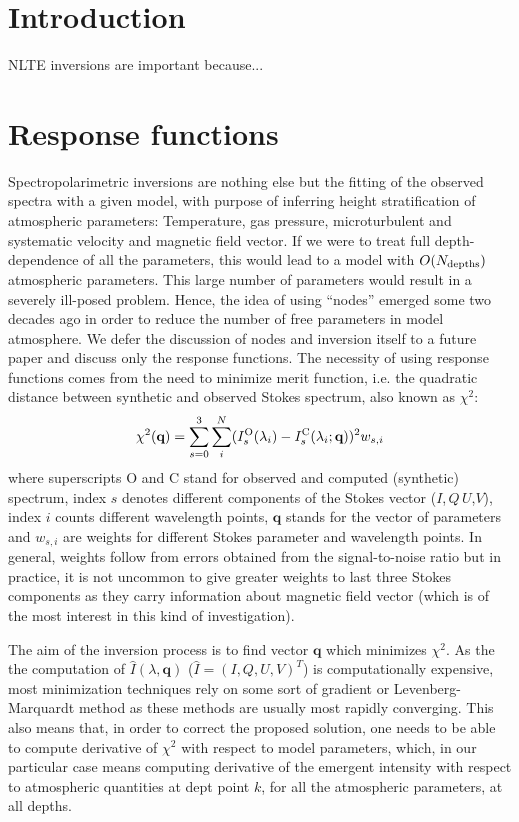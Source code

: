 \documentclass[referee]{aa}
\begin{document}
\section{Introduction}

NLTE inversions are important because... 


\section{Response functions}

Spectropolarimetric inversions are nothing else but the fitting of the observed spectra with a given model, with purpose of inferring height stratification of atmospheric parameters: Temperature, gas pressure, microturbulent and systematic velocity and magnetic field vector. If we were to treat full depth-dependence of all the parameters, this would lead to a model with $O(N_{\rm depths})$ atmospheric parameters. This large number of parameters would result in a severely ill-posed problem. Hence, the idea of using ``nodes'' emerged some two decades ago \citep{SIR} in order to reduce the number of free parameters in model atmosphere. We defer the discussion of nodes and inversion itself to a future paper and discuss only the response functions. The necessity of using response functions comes from the need to minimize merit function, i.e. the quadratic distance between synthetic and observed Stokes spectrum, also known as $\chi^2$:
\begin{equation}
 \chi^2(\textbf{q}) = \sum_{s=0}^3 \sum_{i}^N (I_s^{\rm O}(\lambda_i) - I_s^{\rm C}(\lambda_i; \textbf{q}))^2 w_{s,i}
\end{equation}
where superscripts O and C stand for observed and computed (synthetic) spectrum, index $s$ denotes different components of the Stokes vector ($I$,\,$Q$\,$U$,$V$), index $i$ counts different wavelength points, $\textbf{q}$ stands for the vector of parameters and $w_{s,i}$ are weights for different Stokes parameter and wavelength points. In general, weights follow from errors obtained from the signal-to-noise ratio but in practice, it is not uncommon to give greater weights to last three Stokes components as they carry information about magnetic field vector (which is of the most interest in this kind of investigation).

The aim of the inversion process is to find vector $\textbf{q}$ which minimizes $\chi^2$. As the the computation of $\hat{I}(\lambda, \textbf{q})$ ($\hat{I} = (I,Q,U,V)^T$) is computationally expensive, most minimization techniques rely on some sort of gradient or Levenberg-Marquardt\citep[see, e.g.\,][]{nr02} method as these methods are usually most rapidly converging. This also means that, in order to correct the proposed solution, one needs to be able to compute derivative of $\chi^2$ with respect to model parameters, which, in our particular case means computing derivative of the emergent intensity with respect to atmospheric quantities at dept point $k$, for all the atmospheric parameters, at all depths.
\end{document}
